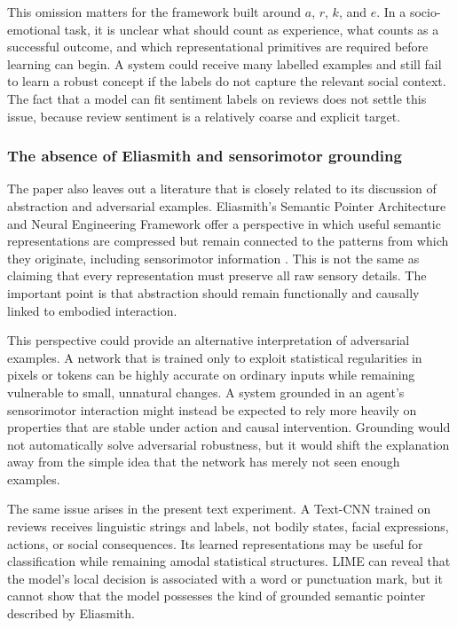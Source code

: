 \documentclass[11pt]{article}
\begin{document}
This omission matters for the framework built around $a$, $r$, $k$, and $e$. In a socio-emotional task, it is unclear what should count as experience, what counts as a successful outcome, and which representational primitives are required before learning can begin. A system could receive many labelled examples and still fail to learn a robust concept if the labels do not capture the relevant social context. The fact that a model can fit sentiment labels on reviews does not settle this issue, because review sentiment is a relatively coarse and explicit target.

\subsubsection*{The absence of Eliasmith and sensorimotor grounding}

The paper also leaves out a literature that is closely related to its discussion of abstraction and adversarial examples. Eliasmith's Semantic Pointer Architecture and Neural Engineering Framework offer a perspective in which useful semantic representations are compressed but remain connected to the patterns from which they originate, including sensorimotor information \citep{eli2013}. This is not the same as claiming that every representation must preserve all raw sensory details. The important point is that abstraction should remain functionally and causally linked to embodied interaction.

This perspective could provide an alternative interpretation of adversarial examples. A network that is trained only to exploit statistical regularities in pixels or tokens can be highly accurate on ordinary inputs while remaining vulnerable to small, unnatural changes. A system grounded in an agent's sensorimotor interaction might instead be expected to rely more heavily on properties that are stable under action and causal intervention. Grounding would not automatically solve adversarial robustness, but it would shift the explanation away from the simple idea that the network has merely not seen enough examples.

The same issue arises in the present text experiment. A Text-CNN trained on reviews receives linguistic strings and labels, not bodily states, facial expressions, actions, or social consequences. Its learned representations may be useful for classification while remaining amodal statistical structures. LIME can reveal that the model's local decision is associated with a word or punctuation mark, but it cannot show that the model possesses the kind of grounded semantic pointer described by Eliasmith.
\end{document}
